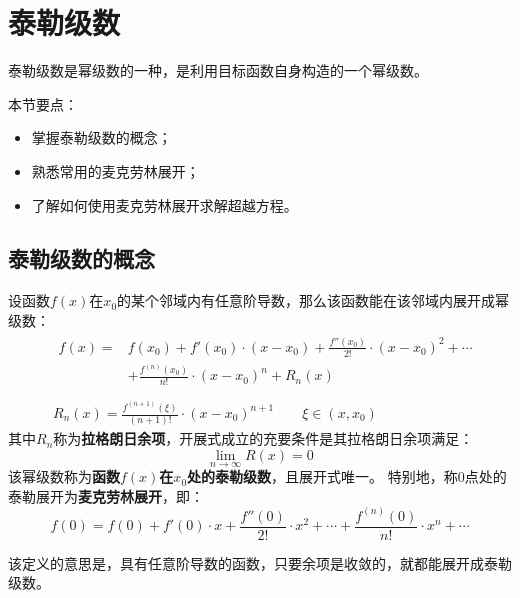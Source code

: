 \section{泰勒级数}

泰勒级数是幂级数的一种，是利用目标函数自身构造的一个幂级数。

本节要点：
\begin{itemize}
    \item 掌握泰勒级数的概念；
    \item 熟悉常用的麦克劳林展开；
    \item 了解如何使用麦克劳林展开求解超越方程。
\end{itemize}

\subsection{泰勒级数的概念}

\begin{definition}[泰勒级数]
设函数$f\left( x \right) $在$x_0$的某个邻域内有任意阶导数，那么该函数能在该邻域内展开成幂级数：
\begin{align*}
&\begin{aligned}
	f\left( x \right) =&f\left( x_0 \right) +f'\left( x_0 \right) \cdot \left( x-x_0 \right) +\frac{f''\left( x_0 \right)}{2!}\cdot \left( x-x_0 \right) ^2+\cdots\\
	&+\frac{f^{\left( n \right)}\left( x_0 \right)}{n!}\cdot \left( x-x_0 \right) ^n+R_n\left( x \right)\\
\end{aligned} \\
&R_n\left( x \right) =\frac{f^{\left( n+1 \right)}\left( \xi \right)}{\left( n+1 \right) !}\cdot \left( x-x_0 \right) ^{n+1} \qquad \xi \in \left( x,x_0 \right)
\end{align*}
其中$R_n$称为{\bf 拉格朗日余项}，开展式成立的充要条件是其拉格朗日余项满足：
\[
\underset{n\rightarrow \infty}{\lim}R\left( x \right) =0
\]
该幂级数称为{\bf 函数$f\left( x \right) $在$x_0$处的泰勒级数}，且展开式唯一。
特别地，称0点处的泰勒展开为{\bf 麦克劳林展开}，即：
\[
f\left( 0 \right) =f\left( 0 \right) +f'\left( 0 \right) \cdot x+\frac{f''\left( 0 \right)}{2!}\cdot x^2+\cdots +\frac{f^{\left( n \right)}\left( 0 \right)}{n!}\cdot x^n+\cdots
\]
\end{definition}

该定义的意思是，具有任意阶导数的函数，只要余项是收敛的，就都能展开成泰勒级数。

